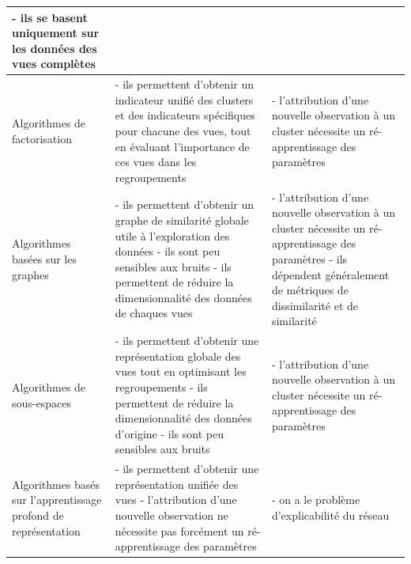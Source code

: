 \begin{longtable}{|p{4.5cm}|p{6cm}|p{6cm}|}
     				   {- ils se basent uniquement sur les données des vues complètes}
     				   \\
  			  \hline
     				   Algorithmes de factorisation
     				   &
     				   {- ils permettent d'obtenir un indicateur unifié des clusters et des indicateurs spécifiques pour chacune des vues, tout en évaluant l'importance de ces vues dans les regroupements} \newline\newline
     				   &
     				   {- l'attribution d'une nouvelle observation à un cluster nécessite un ré-apprentissage des paramètres}
     				   \\
  			  \hline
     				   Algorithmes basées sur les graphes
     				   &
     				   {- ils permettent d'obtenir un graphe de similarité globale utile à l'exploration des données} \newline\newline
     				   {- ils sont peu sensibles aux bruits} \newline\newline
     				   {- ils permettent de réduire la dimensionnalité des données de chaques vues}
     				   &
     				   {- l'attribution d'une nouvelle observation à un cluster nécessite un ré-apprentissage des paramètres} \newline\newline
     				   {- ils dépendent généralement de métriques de dissimilarité et de similarité}
     				   \\
  			  \hline
     				   Algorithmes de sous-espaces
     				   &
     				   {- ils permettent d'obtenir une représentation globale des vues tout en optimisant les regroupements } \newline\newline
          			  {- ils permettent de réduire la dimensionnalité des données d'origine } \newline\newline
     				   {- ils sont peu sensibles aux bruits}
     				   &
     				   {- l'attribution d'une nouvelle observation à un cluster nécessite un ré-apprentissage des paramètres}
     				   \\
  			  \hline
     				   Algorithmes basés sur l'apprentissage profond de représentation
     				   &
     				   {- ils permettent d'obtenir une représentation unifiée des vues } \newline\newline
     				   {- l'attribution d'une nouvelle observation ne nécessite pas forcément un ré-apprentissage des paramètres}
     				   &
     				   {- on a le problème d'explicabilité du réseau}
     				   \\
  			  \hline
  		  \end{longtable}
  		  
